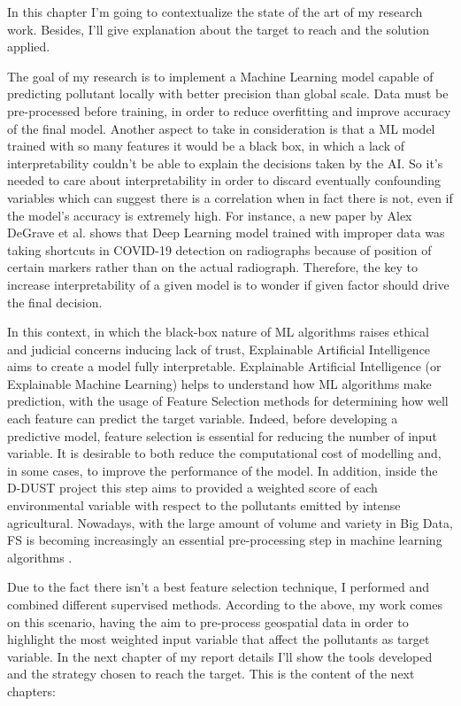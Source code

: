 In this chapter I'm going to contextualize the state of the art of my research work. 
Besides, I'll give explanation about the target to reach and the solution applied.\par
The goal of my research is to implement a Machine Learning model capable of predicting pollutant locally with better precision than global scale. 
Data must be pre-processed before training, in order to reduce overfitting and improve accuracy of the final model.\newline
Another aspect to take in consideration is that a ML model trained with so many features it would be a black box, in which a lack of interpretability couldn't be able to explain the decisions taken by the AI.
So it's needed to care about interpretability in order to discard eventually confounding variables  which can suggest there is a correlation when in fact there is not, even if the model's accuracy is extremely high. \newline
For instance, a new paper by Alex DeGrave et al.\cite{degrave2021ai} shows that Deep Learning model trained with improper data was taking shortcuts in COVID-19 detection on radiographs because of position of certain markers rather than on the actual radiograph.
Therefore, the key to increase interpretability of a given model is to wonder if given factor should drive the final decision.\par
In this context, in which the black-box nature of ML algorithms raises ethical and judicial concerns inducing lack of trust, Explainable Artificial Intelligence aims to create a model fully interpretable.
Explainable Artificial Intelligence (or Explainable Machine Learning) helps to understand how ML algorithms make prediction, with the usage of Feature Selection methods for determining how well each feature can predict the target variable.
Indeed, before developing a predictive model, feature selection is essential for reducing the number of input variable. \newline
It is desirable to both reduce the computational cost of modelling and, in some cases, to improve the performance of the model.\newline
In addition, inside the D-DUST project this step aims to provided a weighted score of each environmental variable with respect to the pollutants emitted by intense agricultural.\newline
Nowadays, with the large amount of volume and variety in Big Data, FS is becoming increasingly an essential pre-processing step in machine learning algorithms \cite{kamolov2021feature}.
\par
\bigskip
Due to the fact there isn’t a best feature selection technique, I performed and combined different supervised methods. \newline
According to the above, my work comes on this scenario, having the aim to pre-process geospatial data in order to highlight the most weighted input variable that affect the pollutants as target variable.\newline
In the next chapter of my report details I'll show the tools developed and the strategy chosen to reach the target. 
This is the content of the next chapters:

